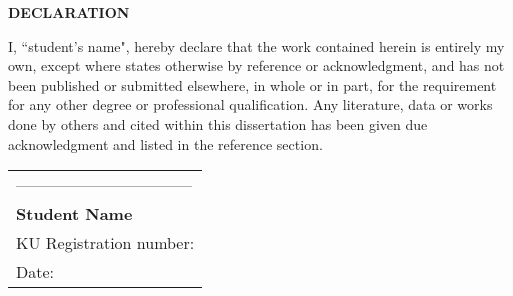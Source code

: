 




\begin{center}
	{\Large{\bf{DECLARATION}}}
\end{center}


\noindent
I, ``student's name", hereby declare that the work contained herein is entirely my own, except where states otherwise by reference or acknowledgment, and has not been published or submitted elsewhere, in whole or in part,  for the requirement for any other degree or professional qualification.  Any literature, data or works done by others and cited within this dissertation has been given due acknowledgment and listed in the reference section. 



\vspace{3cm}





	
\noindent
\hspace{10cm}
\begin{tabular}{l}
	---------------------------------\\
	{\bf Student Name}\\
	KU Registration number:\\
	Date: 
\end{tabular}



